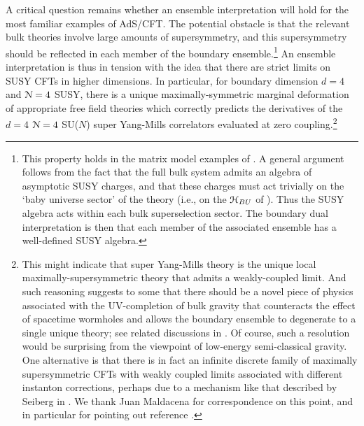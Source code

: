 \documentclass[11pt]{article}
\begin{document}
A critical question remains whether an ensemble interpretation will hold for the most familiar examples of AdS/CFT.  
The potential obstacle is that the relevant bulk theories involve large amounts of supersymmetry, and this supersymmetry should be reflected in each member of the boundary ensemble.\footnote{
    This property holds in the matrix model examples of \cite{Stanford:2019vob}.
    A general argument follows from the fact that the full bulk system admits an algebra of asymptotic SUSY charges, and that these charges must act trivially on the `baby universe sector' of the theory (i.e., on the ${\cal H}_{BU}$ of \cite{Marolf:2020xie,Marolf:2020rpm}).
    Thus the SUSY algebra acts within each bulk superselection sector. The boundary dual interpretation is then that each member of the associated ensemble has a well-defined SUSY algebra.
}
An ensemble interpretation is thus in tension with the idea that there are strict limits on SUSY CFTs in higher dimensions.  
In particular, for boundary dimension $d=4$ and ${\cal N}=4$ SUSY, there is a unique maximally-symmetric marginal deformation of appropriate free field theories which correctly predicts the derivatives of the $d=4$ ${\cal N}=4$ SU($N$) super Yang-Mills correlators evaluated at zero coupling.\footnote{
    This might indicate that  super Yang-Mills theory is the unique local maximally-supersymmetric theory that admits a weakly-coupled limit.   And such reasoning suggests to some that there should be a novel piece of physics associated with the UV-completion of bulk gravity that counteracts the effect of spacetime wormholes and allows the boundary ensemble to degenerate to a single unique theory; see related discussions in \cite{Marolf:2020xie,McNamara:2020uza}. Of course, such a resolution would be surprising from the viewpoint of low-energy semi-classical gravity. One alternative is that there is in fact an infinite discrete family of maximally supersymmetric CFTs with weakly coupled limits associated with different instanton corrections, perhaps due to a mechanism like that described by Seiberg in \cite{Seiberg:2010qd}.  We thank Juan Maldacena for correspondence on this point, and in particular for pointing out reference \cite{Seiberg:2010qd}.
}
\end{document}
